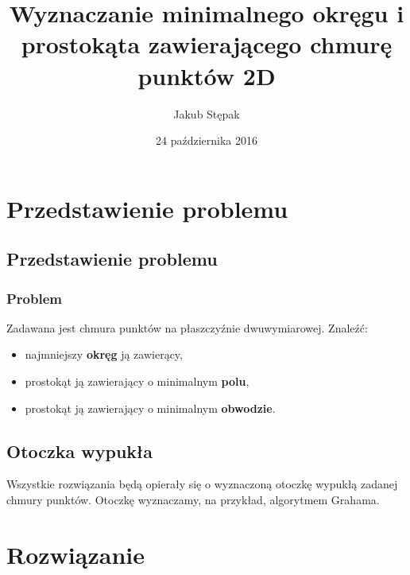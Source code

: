 \documentclass{beamer}
\title
[Minimalny okręg i prostokąt na chmurze punktów]
{Wyznaczanie minimalnego okręgu i prostokąta zawierającego chmurę punktów 2D}
\author
[Jakub Stępak]
{Jakub Stępak}
\institute
[AGH]
{
Akademia Górniczo – Hutnicza w Krakowie
}
\date{24 października 2016}
\begin{document}
\frame{\titlepage}


\section{Przedstawienie problemu}

\subsection{Przedstawienie problemu}

\begin{frame}

\frametitle{Problem}
Zadawana jest chmura punktów na płaszczyźnie dwuwymiarowej.
\linebreak
\linebreak
Znaleźć:
\begin{itemize}
\item najmniejszy \textbf{okręg} ją zawierący,
\item prostokąt ją zawierający o minimalnym \textbf{polu},
\item prostokąt ją zawierający o minimalnym \textbf{obwodzie}.
\end{itemize}

\end{frame}


\subsection{Otoczka wypukła}

\begin{frame}

Wszystkie rozwiązania będą opierały się o wyznaczoną otoczkę wypukłą zadanej chmury punktów. 
\linebreak 
\linebreak
Otoczkę wyznaczamy, na przykład, algorytmem Grahama.

\end{frame}


\section{Rozwiązanie}
\end{document}
